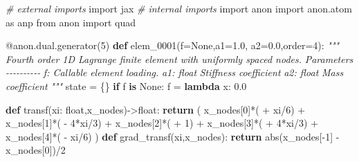\documentclass[
  11pt,
]{article}
\newenvironment{Shaded}{}{}
\newcommand{\AttributeTok}[1]{\textcolor[rgb]{0.49,0.56,0.16}{#1}}
\newcommand{\BuiltInTok}[1]{#1}
\newcommand{\CommentTok}[1]{\textcolor[rgb]{0.38,0.63,0.69}{\textit{#1}}}
\newcommand{\ControlFlowTok}[1]{\textcolor[rgb]{0.00,0.44,0.13}{\textbf{#1}}}
\newcommand{\DecValTok}[1]{\textcolor[rgb]{0.25,0.63,0.44}{#1}}
\newcommand{\FloatTok}[1]{\textcolor[rgb]{0.25,0.63,0.44}{#1}}
\newcommand{\ImportTok}[1]{#1}
\newcommand{\KeywordTok}[1]{\textcolor[rgb]{0.00,0.44,0.13}{\textbf{#1}}}
\newcommand{\NormalTok}[1]{#1}
\newcommand{\OperatorTok}[1]{\textcolor[rgb]{0.40,0.40,0.40}{#1}}
\newcommand{\VariableTok}[1]{\textcolor[rgb]{0.10,0.09,0.49}{#1}}
\begin{document}
\begin{Shaded}
\begin{Highlighting}[]
\CommentTok{\# external imports}
\ImportTok{import}\NormalTok{ jax}
\CommentTok{\# internal imports}
\ImportTok{import}\NormalTok{ anon}
\ImportTok{import}\NormalTok{ anon.atom }\ImportTok{as}\NormalTok{ anp}
\ImportTok{from}\NormalTok{ anon }\ImportTok{import}\NormalTok{ quad}

\AttributeTok{@anon.dual.generator}\NormalTok{(}\DecValTok{5}\NormalTok{)}
\KeywordTok{def}\NormalTok{ elem\_0001(f}\OperatorTok{=}\VariableTok{None}\NormalTok{,a1}\OperatorTok{=}\FloatTok{1.0}\NormalTok{, a2}\OperatorTok{=}\FloatTok{0.0}\NormalTok{,order}\OperatorTok{=}\DecValTok{4}\NormalTok{):}
    \CommentTok{"""}
\CommentTok{    Fourth order 1D Lagrange finite element with uniformly spaced nodes.}
\CommentTok{    }
\CommentTok{    Parameters}
\CommentTok{    {-}{-}{-}{-}{-}{-}{-}{-}{-}{-}}
\CommentTok{    f: Callable}
\CommentTok{        element loading.}
\CommentTok{    a1: float}
\CommentTok{        Stiffness coefficient}
\CommentTok{    a2: float}
\CommentTok{        Mass coefficient}
\CommentTok{    """}
\NormalTok{    state }\OperatorTok{=}\NormalTok{ \{\}}
    \ControlFlowTok{if}\NormalTok{ f }\KeywordTok{is} \VariableTok{None}\NormalTok{: f }\OperatorTok{=} \KeywordTok{lambda}\NormalTok{ x: }\FloatTok{0.0}

    \KeywordTok{def}\NormalTok{ transf(xi: }\BuiltInTok{float}\NormalTok{,x\_nodes)}\OperatorTok{{-}\textgreater{}}\BuiltInTok{float}\NormalTok{:}
        \ControlFlowTok{return}\NormalTok{ ( x\_nodes[}\DecValTok{0}\NormalTok{]}\OperatorTok{*}\NormalTok{( }\OperatorTok{+}\NormalTok{ xi}\OperatorTok{/}\DecValTok{6}\NormalTok{) }
               \OperatorTok{+}\NormalTok{ x\_nodes[}\DecValTok{1}\NormalTok{]}\OperatorTok{*}\NormalTok{( }\OperatorTok{{-}} \DecValTok{4}\OperatorTok{*}\NormalTok{xi}\OperatorTok{/}\DecValTok{3}\NormalTok{) }
               \OperatorTok{+}\NormalTok{ x\_nodes[}\DecValTok{2}\NormalTok{]}\OperatorTok{*}\NormalTok{( }\OperatorTok{+} \DecValTok{1}\NormalTok{) }
               \OperatorTok{+}\NormalTok{ x\_nodes[}\DecValTok{3}\NormalTok{]}\OperatorTok{*}\NormalTok{( }\OperatorTok{+} \DecValTok{4}\OperatorTok{*}\NormalTok{xi}\OperatorTok{/}\DecValTok{3}\NormalTok{) }
               \OperatorTok{+}\NormalTok{ x\_nodes[}\DecValTok{4}\NormalTok{]}\OperatorTok{*}\NormalTok{( }\OperatorTok{{-}}\NormalTok{ xi}\OperatorTok{/}\DecValTok{6}\NormalTok{)}
\NormalTok{        )}
    \KeywordTok{def}\NormalTok{ grad\_transf(xi,x\_nodes):}
        \ControlFlowTok{return} \BuiltInTok{abs}\NormalTok{(x\_nodes[}\OperatorTok{{-}}\DecValTok{1}\NormalTok{] }\OperatorTok{{-}}\NormalTok{ x\_nodes[}\DecValTok{0}\NormalTok{])}\OperatorTok{/}\DecValTok{2}
    

\end{Highlighting}
\end{Shaded}
\end{document}
